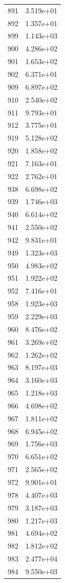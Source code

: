 \documentclass[12pt]{article}
\begin{document}
\begin{longtable}{@{}cc@{}}
891 & 3.519e+01 \\
892 & 1.357e+01 \\
899 & 1.143e+03 \\
900 & 4.286e+02 \\
901 & 1.653e+02 \\
902 & 6.371e+01 \\
909 & 6.897e+02 \\
910 & 2.540e+02 \\
911 & 9.793e+01 \\
912 & 3.775e+01 \\
919 & 5.128e+02 \\
920 & 1.858e+02 \\
921 & 7.163e+01 \\
922 & 2.762e+01 \\
938 & 6.698e+02 \\
939 & 1.746e+03 \\
940 & 6.614e+02 \\
941 & 2.550e+02 \\
942 & 9.831e+01 \\
949 & 1.323e+03 \\
950 & 4.983e+02 \\
951 & 1.922e+02 \\
952 & 7.416e+01 \\
958 & 1.923e+03 \\
959 & 2.229e+03 \\
960 & 8.476e+02 \\
961 & 3.269e+02 \\
962 & 1.262e+02 \\
963 & 8.197e+03 \\
964 & 3.160e+03 \\
965 & 1.218e+03 \\
966 & 4.698e+02 \\
967 & 1.811e+02 \\
968 & 6.945e+02 \\
969 & 1.756e+03 \\
970 & 6.651e+02 \\
971 & 2.565e+02 \\
972 & 9.901e+01 \\
978 & 4.407e+03 \\
979 & 3.187e+03 \\
980 & 1.217e+03 \\
981 & 4.694e+02 \\
982 & 1.812e+02 \\
983 & 2.477e+04 \\
984 & 9.550e+03 \\

\end{longtable}
\end{document}
